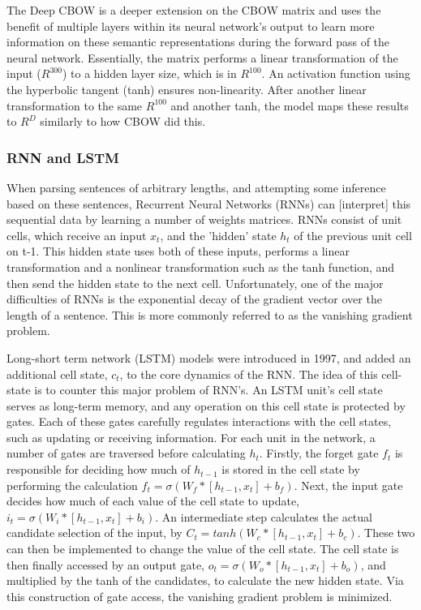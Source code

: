 The Deep CBOW is a deeper extension on the CBOW matrix and uses the benefit of
multiple layers within its neural network's output to learn more information on
these semantic representations during the forward pass of the neural network.
Essentially, the matrix performs a linear transformation of the input
($R^{300}$) to a hidden layer size, which is in $R^{100}$. An activation
function using the hyperbolic tangent (tanh) ensures non-linearity. After
another linear transformation to the same $R^{100}$ and another tanh, the model
maps these results to $R^D$ similarly to how CBOW did this. 


\subsubsection{RNN and LSTM}
When parsing sentences of arbitrary lengths, and attempting some inference based
on these sentences, Recurrent Neural Networks (RNNs) can [interpret] this
sequential data by learning a number of weights matrices. RNNs consist of unit
cells, which receive an input $x_t$, and the 'hidden' state $h_t$ of the
previous unit cell on t-1. This hidden state uses both of these inputs, performs
a linear transformation and a nonlinear transformation such as the tanh
function, and then send the hidden state to the next cell. Unfortunately, one of
the major difficulties of RNNs is the exponential decay of the gradient vector
over the length of a sentence\cite{bengio1994learning}. This is more commonly
referred to as the vanishing gradient problem.

Long-short term network (LSTM) models \cite{hochreiter1997long} were introduced
in 1997, and added an additional cell state, $c_t$, to the core dynamics of the
RNN. The idea of this cell-state is to counter this major problem of RNN's. An
LSTM unit's cell state serves as long-term memory, and any operation on this
cell state is protected by gates. Each of these gates carefully regulates
interactions with the cell states, such as updating or receiving information.
For each unit in the network, a number of gates are traversed before calculating
$h_t$. Firstly, the forget gate $f_t$ is responsible for deciding how much of
$h_{t-1}$ is stored in the cell state by performing the calculation $f_t =
\sigma(W_f * [h_{t-1}, x_t] + b_f)$. Next, the input gate decides how much of
each value of the cell state to update, $i_t = \sigma(W_i * [h_{t-1}, x_t] +
b_i)$. An intermediate step calculates the actual candidate selection of the
input, by $C_t = tanh(W_c * [h_{t-1}, x_t] + b_c)$. These two can then be
implemented to change the value of the cell state. The cell state is then
finally accessed by an output gate, $o_t = \sigma(W_o * [h_{t-1}, x_t] + b_o)$,
and multiplied by the tanh of the candidates, to calculate the new hidden state.
Via this construction of gate access, the vanishing gradient problem is
minimized.
